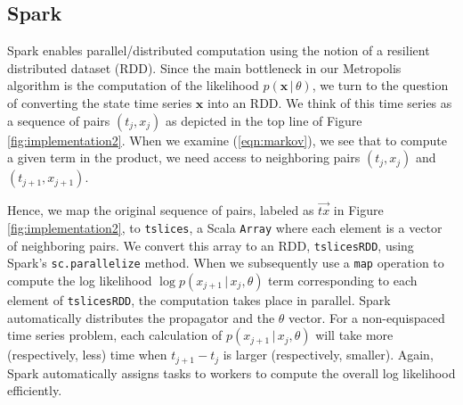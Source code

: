 \documentclass[wcp]{jmlr}
\begin{document}
\subsection{Spark}
\label{sect:spark}
Spark enables parallel/distributed computation using the notion of a
resilient distributed dataset (RDD).  Since the main bottleneck in our
Metropolis algorithm is the computation of the likelihood
$p(\mathbf{x} \, | \, \theta)$, we turn to the question of converting
the state time series $\mathbf{x}$ into an RDD.  We think of this time
series as a sequence of pairs $(t_j,x_j)$ as depicted in the
top line of Figure \ref{fig:implementation2}.  When we examine
(\ref{eqn:markov}), we see that to compute a given term in the product,
we need access to neighboring pairs $(t_j,x_j)$ and
$(t_{j+1},x_{j+1})$.

Hence, we map the original sequence of pairs,
labeled as $\overrightarrow{tx}$ in Figure \ref{fig:implementation2}, to
\texttt{tslices}, a Scala \texttt{Array} where each element is a
vector of neighboring pairs.  We convert this array to an RDD, \texttt{tslicesRDD}, using
Spark's \texttt{sc.parallelize} method.  When we subsequently use a
\texttt{map} operation to compute the log likelihood $\log p(x_{j+1} \, | \,
x_j, \theta)$ term corresponding to each element of \texttt{tslicesRDD},
the computation takes place in parallel.  Spark automatically
distributes the propagator and the $\theta$ vector.  For a
non-equispaced time series problem, each calculation of
$p(x_{j+1} \, | \, x_j, \theta)$ will take more (respectively, less)
time when $t_{j+1} - t_j$ is larger (respectively, smaller).  Again, Spark automatically
assigns tasks to workers to compute the overall log likelihood efficiently.
\end{document}
